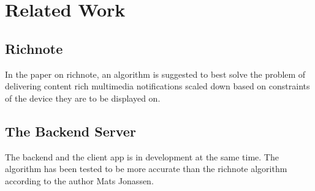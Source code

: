 
\chapter{Related Work} %
\label{Chapter2}

\section{Richnote} 
In the paper on richnote\cite{Richnote}, an algorithm is suggested to best solve the problem of delivering content rich multimedia notifications scaled down based on constraints of the device they are to be displayed on.

\section{The Backend Server}
The backend and the client app is in development at the same time. The algorithm has been tested to be more accurate than the richnote algorithm according to the author Mats Jonassen.
